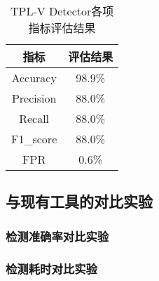 \begin{table}[!hpt]
  \caption{TPL-V Detector各项指标评估结果}
  \label{tab:metric}
  \centering
  \begin{tabular}{cc} \toprule
    指标 &  评估结果 \\ \midrule
	Accuracy & 98.9\% \\
	Precision & 88.0\% \\
	Recall & 88.0\% \\
	F1\_score & 88.0\% \\
	FPR & 0.6\% \\
	 \bottomrule
  \end{tabular}
\end{table}



\subsection{与现有工具的对比实验}

\subsubsection{检测准确率对比实验}

\subsubsection{检测耗时对比实验}








